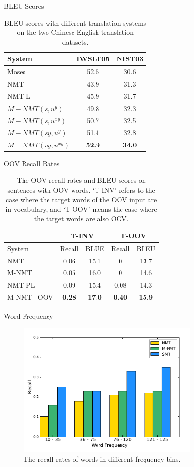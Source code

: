 \documentclass{beamer}
\begin{document}
\begin{frame}{BLEU Scores}
\begin{table}
\begin{tabular}{|l|c|c|}
\hline
System & IWSLT05 & NIST03 \\
\hline
Moses & 52.5 & 30.6 \\
\hline 
NMT & 43.9 & 31.3 \\
\hline
NMT-L & 45.9 & 31.7 \\
\hline
$M-NMT(s,u^y)$ & 49.8 & 32.3 \\
$M-NMT(s,u^{xy})$ & 50.7 & 32.5 \\
$M-NMT(sy,u^y)$ & 51.4 & 32.8 \\
$M-NMT(sy,u^{xy})$ & \textbf{52.9} & \textbf{34.0} \\
\hline
\end{tabular}
\caption{BLEU scores with different translation systems on the two Chinese-English translation datasets.}
\end{table}
\end{frame}

\begin{frame}{OOV Recall Rates}
\begin{table}
\begin{tabular}{|l|c|c|c|c|}
\hline
& \multicolumn{2}{|c|}{T-INV} & \multicolumn{2}{|c|}{T-OOV} \\
\hline
System & Recall & BLUE & Recall & BLEU \\
\hline
NMT & 0.06 & 15.1 & 0 & 13.7 \\
\hline
M-NMT & 0.05 & 16.0 & 0 & 14.6 \\
\hline
NMT-PL & 0.09 & 15.4 & 0.08 & 14.3 \\
\hline
M-NMT+OOV & \textbf{0.28} & \textbf{17.0} & \textbf{0.40} & \textbf{15.9} \\
\hline
\end{tabular}
\caption{The OOV recall rates and BLEU scores on sentences with OOV words. ‘T-INV’ refers to the case where the target words of the OOV input are in-vocabulary, and ‘T-OOV’ means the case where the target words are also OOV.}
\end{table}
\end{frame}

\begin{frame}{Word Frequency}
\begin{figure}
\centering
\includegraphics[width=9cm]{recall}
\caption{The recall rates of words in different frequency bins.}
\end{figure}
\end{frame}
\end{document}
